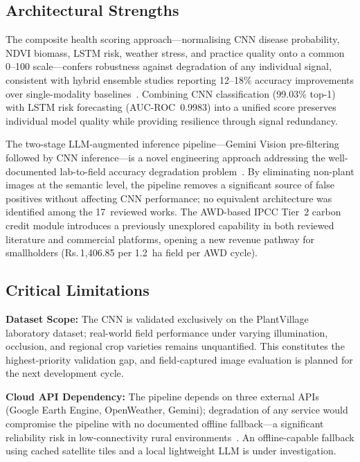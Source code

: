 \documentclass[conference]{IEEEtran}
\begin{document}
\subsection{Architectural Strengths}

The composite health scoring approach---normalising CNN disease probability, NDVI biomass, LSTM risk, weather stress, and practice quality onto a common 0--100 scale---confers robustness against degradation of any individual signal, consistent with hybrid ensemble studies reporting 12--18\% accuracy improvements over single-modality baselines~\cite{b1,b9,b13}. Combining CNN classification (99.03\% top-1) with LSTM risk forecasting (AUC-ROC~0.9983) into a unified score preserves individual model quality while providing resilience through signal redundancy.

The two-stage LLM-augmented inference pipeline---Gemini Vision pre-filtering followed by CNN inference---is a novel engineering approach addressing the well-documented lab-to-field accuracy degradation problem~\cite{b4,b19}. By eliminating non-plant images at the semantic level, the pipeline removes a significant source of false positives without affecting CNN performance; no equivalent architecture was identified among the 17~reviewed works. The AWD-based IPCC Tier~2 carbon credit module introduces a previously unexplored capability in both reviewed literature and commercial platforms, opening a new revenue pathway for smallholders (Rs.\,1{,}406.85 per 1.2~ha field per AWD cycle).

\subsection{Critical Limitations}

\textbf{Dataset Scope:} The CNN is validated exclusively on the PlantVillage laboratory dataset; real-world field performance under varying illumination, occlusion, and regional crop varieties remains unquantified. This constitutes the highest-priority validation gap, and field-captured image evaluation is planned for the next development cycle.

\textbf{Cloud API Dependency:} The pipeline depends on three external APIs (Google Earth Engine, OpenWeather, Gemini); degradation of any service would compromise the pipeline with no documented offline fallback---a significant reliability risk in low-connectivity rural environments~\cite{b9}. An offline-capable fallback using cached satellite tiles and a local lightweight LLM is under investigation.
\end{document}
